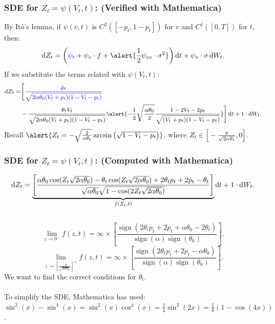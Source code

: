 \documentclass[aspectratio=169]{beamer}\usepackage[utf8]{inputenc}
\DeclareMathOperator{\sign}{sign}
\begin{document}
\begin{frame}\frametitle{SDE for $Z_t=\psi(V_t,t)$: ({\color{green}Verified with Mathematica})}

By It\^o's lemma, if $\psi(v,t)$ is $C^2([-p_t,1-p_t])$ for $v$ and $C^1([0,T])$ for $t$, then:
\begin{equation*}
\dif Z_t=\left({\color{blue}\psi_t}+\psi_v\cdot f+\alert{\frac{1}{2}\psi_{vv}\cdot\sigma^2}\right)\dif t+\psi_v\cdot\sigma\dif W_t.
\end{equation*}
If we substitute the terms related with $\psi(V_t,t)$:
\begin{equation*}
{\footnotesize
\begin{split}
\dif Z_t=&\Bigg[{\color{blue}\frac{\dot{p}_t}{\sqrt{2\alpha\theta_0(V_t+p_t)(1-V_t-p_t)}}}\\
&-\frac{\theta_tV_t}{\sqrt{2\alpha\theta_0(V_t+p_t)(1-V_t-p_t)}}\alert{-\frac{1}{2}\sqrt{\frac{\alpha\theta_0}{2}}\frac{1-2V_t-2p_t}{\sqrt{(V_t+p_t)(1-V_t-p_t)}}}\Bigg]\dif t+1\cdot \dif W_t.
\end{split}}
\end{equation*}
Recall $\alert{Z_t=-\sqrt{\frac{2}{\alpha\theta_t}}\arcsin\left(\sqrt{1-V_t-p_t}\right)}$, where $Z_t\in\Big[-\frac{\pi}{\sqrt{2\alpha\theta_t}},{\color{black}0\Big]}$.
\end{frame}


\begin{frame}\frametitle{SDE for $Z_t=\psi(V_t,t)$: ({\color{green}Computed with Mathematica})}

\begin{equation*}
\dif Z_t=\underbrace{\left[\frac{\alpha\theta_0\cos(Z_t\sqrt{2\alpha\theta_0})-\theta_t\cos(Z_t\sqrt{2\alpha\theta_0})+2\theta_tp_t+2\dot{p}_t-\theta_t}{\sqrt{\alpha\theta_0}\sqrt{1-\cos(2Z_t\sqrt{2\alpha\theta_0})}}\right]}_{f(Z_t,t)}\dif t+1\cdot\dif W_t.
\end{equation*}\\
\begin{equation*}
\lim_{z\to0^-}f(z,t)=\infty\times\left[\frac{\sign\left(2\theta_tp_t+2\dot{p}_t+\alpha\theta_0-2\theta_t\right)}{\sign(\alpha)\sign(\theta_0)}\right].
\end{equation*}
\begin{equation*}
\lim_{z\to\left[\frac{-\pi}{\sqrt{2\alpha\theta_0}}\right]^+}f(z,t)=\infty\times\left[\frac{\sign\left(2\theta_tp_t+2\dot{p}_t-\alpha\theta_0\right)}{\sign(\alpha)\sign(\theta_0)}\right].
\end{equation*}
We want to find the correct conditions for $\theta_t$.\\
\quad\\
{\small To simplify the SDE, Mathematica has used: $\sin^2(x)-\sin^4(x)=\sin^2(x)\cos^2(x)=\frac{1}{4}\sin^2(2x)=\frac{1}{8}(1-\cos(4x))$.}

\end{frame}
\end{document}
